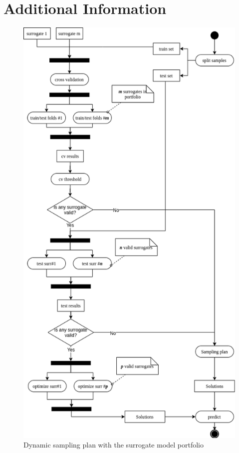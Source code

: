 \documentclass[ms,english]{stthesis}
\begin{document}
    \section{Additional Information}
        \begin{figure}
            \centering
            \includegraphics[width=\textwidth]{content/images/activity_workflow}
            \caption[Workflow 1]{Dynamic sampling plan with the surrogate model portfolio}
            \label{fig:workflow_1}
        \end{figure}
\end{document}
